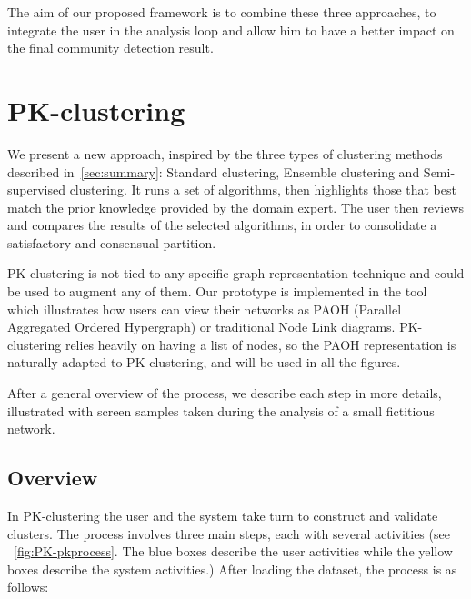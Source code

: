 The aim of our proposed framework is to combine these three approaches, to integrate the user in the analysis loop and allow him to have a better impact on the final community detection result.



\section{PK-clustering}

We present a new approach, inspired by the three types of clustering methods described in~\autoref{sec:summary}: Standard clustering, Ensemble clustering and Semi-supervised clustering. It runs a set of algorithms, then highlights those that best match the prior knowledge provided by the domain expert. %
The user then reviews and compares the results of the selected algorithms, in order to consolidate a satisfactory and consensual partition.

PK-clustering is not tied to any specific graph representation technique and could be used to augment any of them. Our prototype is implemented in the \paovis tool~\cite{paohvis} which illustrates how users can view their networks as PAOH (Parallel Aggregated Ordered Hypergraph) or traditional Node Link diagrams. PK-clustering relies heavily on having a list of nodes, so the PAOH representation is naturally adapted to PK-clustering, and will be used in all the figures.

After a general overview of the process, we describe each step in more details, illustrated with screen samples taken during the analysis of a small fictitious network.

\subsection{Overview}
\label{sec:pk-clustering}

In PK-clustering the user and the system take turn to construct and validate clusters.
The process involves three main steps, each with several activities (see ~\autoref{fig:PK-pkprocess}.
The blue boxes describe the user activities while the yellow boxes describe the system activities.)
After loading the dataset, the process is as follows:

